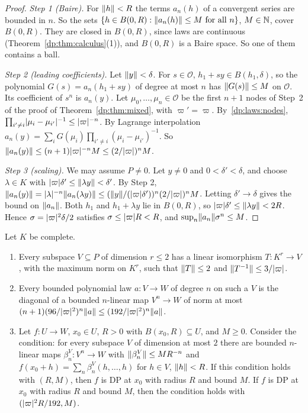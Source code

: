 \begin{proof}
\emph{Step 1 (Baire).} For $\lVert h\rVert<R$ the terms $a_n(h)$ of a convergent series are bounded in $n$. So the sets $\{h\in B(0,R):\lVert a_n(h)\rVert\le M\text{ for all }n\}$, $M\in\mathbb N$, cover $B(0,R)$. They are closed in $B(0,R)$, since laws are continuous (Theorem~\ref{dp:thm:calculus}(1)), and $B(0,R)$ is a Baire space. So one of them contains a ball.

\emph{Step 2 (leading coefficients).} Let $\lVert y\rVert<\delta$. For $s\in\mathcal O$, $h_1+sy\in B(h_1,\delta)$, so the polynomial $G(s)=a_n(h_1+sy)$ of degree at most $n$ has $\lVert G(s)\rVert\le M$ on $\mathcal O$. Its coefficient of $s^n$ is $a_n(y)$. Let $\mu_0,\dots,\mu_n\in\mathcal O$ be the first $n+1$ nodes of Step~2 of the proof of Theorem~\ref{dp:thm:mixed}, with $\varpi'=\varpi$. By~\eqref{dp:laws:nodes}, $\prod_{i'\ne i}\lvert \mu_i-\mu_{i'}\rvert^{-1}\le\lvert \varpi\rvert^{-n}$. By Lagrange interpolation $a_n(y)=\sum_iG(\mu_i)\prod_{i'\ne i}(\mu_i-\mu_{i'})^{-1}$. So $\lVert a_n(y)\rVert\le(n+1)\lvert \varpi\rvert^{-n}M\le(2/\lvert \varpi\rvert)^nM$.

\emph{Step 3 (scaling).} We may assume $P\ne0$. Let $y\ne0$ and $0<\delta'<\delta$, and choose $\lambda\in K$ with $\lvert \varpi\rvert\delta'\le\lVert \lambda y\rVert<\delta'$. By Step 2, $\lVert a_n(y)\rVert=\lvert \lambda\rvert^{-n}\lVert a_n(\lambda y)\rVert\le(\lVert y\rVert/(\lvert \varpi\rvert\delta'))^n(2/\lvert \varpi\rvert)^nM$. Letting $\delta'\to\delta$ gives the bound on $\lVert a_n\rVert$. Both $h_1$ and $h_1+\lambda y$ lie in $B(0,R)$, so $\lvert \varpi\rvert\delta'\le\lVert \lambda y\rVert<2R$. Hence $\sigma=\lvert \varpi\rvert^2\delta/2$ satisfies $\sigma\le\lvert \varpi\rvert R<R$, and $\sup_n\lVert a_n\rVert\sigma^n\le M$.
\end{proof}

\begin{theorem}\label{dp:thm:planes}
Let $K$ be complete.
\begin{enumerate}
\item Every subspace $V\subseteq P$ of dimension $r\le2$ has a linear isomorphism $T\colon K^r\to V$, with the maximum norm on $K^r$, such that $\lVert T\rVert\le2$ and $\lVert T^{-1}\rVert\le3/\lvert \varpi\rvert$.
\item Every bounded polynomial law $a\colon V\to W$ of degree $n$ on such a $V$ is the diagonal of a bounded $n$\nobreakdash-linear map $V^n\to W$ of norm at most $(n+1)(96/\lvert \varpi\rvert^2)^n\lVert a\rVert\le(192/\lvert \varpi\rvert^2)^n\lVert a\rVert$.
\item Let $f\colon U\to W$, $x_0\in U$, $R>0$ with $B(x_0,R)\subseteq U$, and $M\ge0$. Consider the condition: for every subspace $V$ of dimension at most $2$ there are bounded $n$\nobreakdash-linear maps $\beta^V_n\colon V^n\to W$ with $\lVert \beta^V_n\rVert\le MR^{-n}$ and $f(x_0+h)=\sum_n\beta^V_n(h,\dots,h)$ for $h\in V$, $\lVert h\rVert<R$. If this condition holds with $(R,M)$, then $f$ is DP at $x_0$ with radius $R$ and bound $M$. If $f$ is DP at $x_0$ with radius $R$ and bound $M$, then the condition holds with $(\lvert \varpi\rvert^2R/192,M)$.
\end{enumerate}
\end{theorem}


